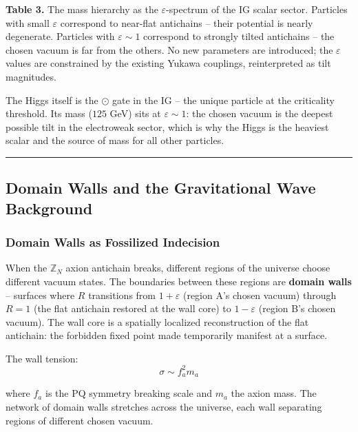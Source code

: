 \documentclass[12pt,a4paper]{article}
\begin{document}
\textbf{Table 3.} The mass hierarchy as the \(\varepsilon\)-spectrum of
the IG scalar sector. Particles with small \(\varepsilon\) correspond to
near-flat antichains -- their potential is nearly degenerate. Particles
with \(\varepsilon \sim 1\) correspond to strongly tilted antichains --
the chosen vacuum is far from the others. No new parameters are
introduced; the \(\varepsilon\) values are constrained by the existing
Yukawa couplings, reinterpreted as tilt magnitudes.

The Higgs itself is the \(\odot\) gate in the IG -- the unique particle
at the criticality threshold. Its mass (\(125\) GeV) sits at
\(\varepsilon \sim 1\): the chosen vacuum is the deepest possible tilt
in the electroweak sector, which is why the Higgs is the heaviest scalar
and the source of mass for all other particles.

\begin{center}\rule{0.5\linewidth}{0.5pt}\end{center}

\hypertarget{domain-walls-and-the-gravitational-wave-background}{%
\subsection{Domain Walls and the Gravitational Wave
Background}\label{domain-walls-and-the-gravitational-wave-background}}

\hypertarget{domain-walls-as-fossilized-indecision}{%
\subsubsection{Domain Walls as Fossilized
Indecision}\label{domain-walls-as-fossilized-indecision}}

When the \(\mathbb{Z}_N\) axion antichain breaks, different regions of
the universe choose different vacuum states. The boundaries between
these regions are \textbf{domain walls} -- surfaces where \(R\)
transitions from \(1 + \varepsilon\) (region A's chosen vacuum) through
\(R = 1\) (the flat antichain restored at the wall core) to
\(1 - \varepsilon\) (region B's chosen vacuum). The wall core is a
spatially localized reconstruction of the flat antichain: the forbidden
fixed point made temporarily manifest at a surface.

The wall tension: \[\sigma \sim f_a^2 m_a\]

where \(f_a\) is the PQ symmetry breaking scale and \(m_a\) the axion
mass. The network of domain walls stretches across the universe, each
wall separating regions of different chosen vacuum.
\end{document}
